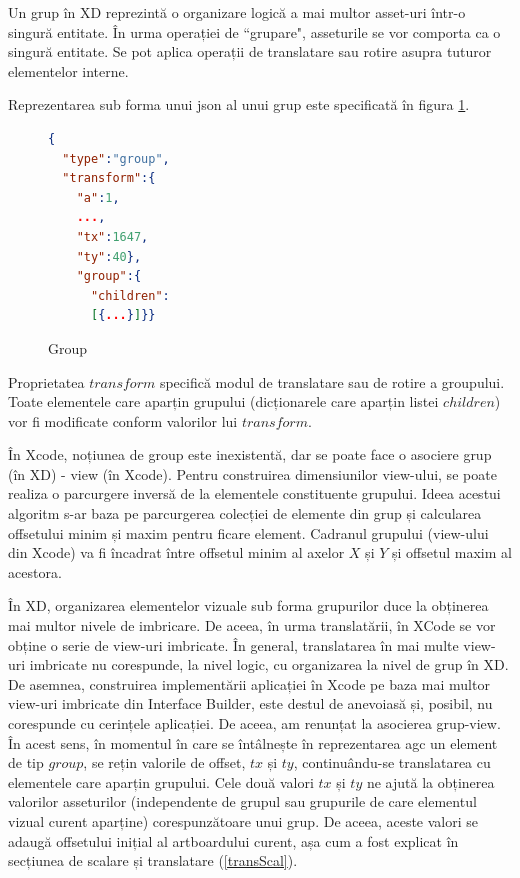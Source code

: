 Un grup în XD reprezintă o organizare logică a mai multor asset-uri într-o singură entitate. În urma operației de ``grupare", asseturile se vor comporta ca o singură entitate. Se pot aplica operații de translatare sau rotire asupra tuturor elementelor interne. 

Reprezentarea sub forma unui json al unui grup este specificată în figura \ref{fig:Group}. 

\begin{figure}[!htbp]
\begin{lstlisting}[language=json,firstnumber=1]
{
  "type":"group",
  "transform":{
    "a":1,
    ...,
    "tx":1647,
    "ty":40},
    "group":{
      "children":
      [{...}]}}
\end{lstlisting}
\caption{Group} \label{fig:Group}
\end{figure}

Proprietatea $transform$ specifică modul de translatare sau de rotire a groupului. Toate elementele care aparțin grupului (dicționarele care aparțin listei $children$) vor fi modificate conform valorilor lui $transform$.

În Xcode, noțiunea de group este inexistentă, dar se poate face o asociere grup (în XD) - view (în Xcode).  
Pentru construirea dimensiunilor view-ului, se poate realiza o parcurgere inversă de la elementele constituente grupului. Ideea acestui algoritm s-ar baza pe parcurgerea colecției de elemente din grup și calcularea offsetului minim și maxim pentru ficare element. Cadranul grupului (view-ului din Xcode) va fi încadrat între offsetul minim al axelor $X$ și $Y$ și offsetul maxim al acestora.

În XD, organizarea elementelor vizuale sub forma grupurilor duce la obținerea mai multor nivele de imbricare. De aceea, în urma translatării, în XCode se vor obține o serie de view-uri imbricate. În general, translatarea în mai multe view-uri imbricate nu corespunde, la nivel logic, cu organizarea la nivel de grup în XD. De asemnea, construirea implementării aplicației în Xcode pe baza mai multor view-uri imbricate din Interface Builder, este destul de anevoiasă și, posibil, nu corespunde cu cerințele aplicației. De aceea, am renunțat la asocierea grup-view. În acest sens, în momentul în care se întâlnește în reprezentarea agc un element de tip $group$, se rețin valorile de offset, $tx$ și $ty$, continuându-se translatarea cu elementele care aparțin grupului.  Cele două valori $tx$ și $ty$ ne ajută la obținerea valorilor asseturilor (independente de grupul sau grupurile de care elementul vizual curent aparține) corespunzătoare unui grup. De aceea, aceste valori se adaugă offsetului inițial al artboardului curent, așa cum a fost explicat în secțiunea de scalare și translatare (\ref{transScal}).

